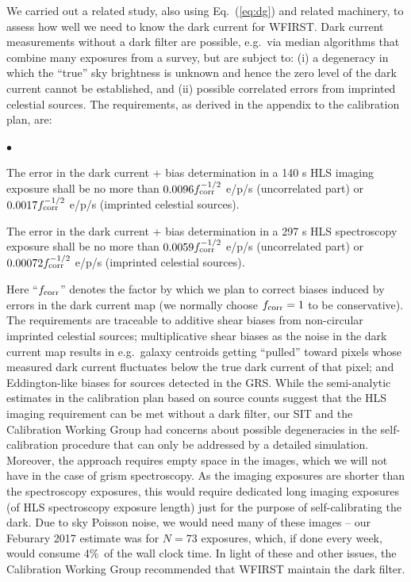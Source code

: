 We carried out a related study, also using Eq.~(\ref{eq:dg}) and related machinery, to assess how well we need to know the dark current for WFIRST. Dark current measurements without a dark filter are possible, e.g.\ via median algorithms that combine many exposures from a survey, but are subject to: (i) a degeneracy in which the ``true'' sky brightness is unknown and hence the zero level of the dark current cannot be established, and (ii) possible correlated errors from imprinted celestial sources. The requirements, as derived in the appendix to the calibration plan, are:
\begin{list}{$\bullet$}{}
\item The error in the dark current + bias determination in a 140 s
HLS imaging exposure shall be no more than $0.0096f_{\rm corr}^{-1/2}$
e/p/s (uncorrelated part) or $0.0017 f_{\rm corr}^{-1/2}$ e/p/s
(imprinted celestial sources).
\item The error in the dark current + bias determination in a 297 s
HLS spectroscopy exposure shall be no more than $0.0059 f_{\rm
corr}^{-1/2}$ e/p/s (uncorrelated part) or $0.00072 f_{\rm
corr}^{-1/2}$ e/p/s (imprinted celestial sources).
\end{list}
Here ``$f_{\rm corr}$'' denotes the factor by which we plan to correct biases induced by errors in the dark current map (we normally choose $f_{\rm corr}=1$ to be conservative). The requirements are traceable to additive shear biases from non-circular imprinted celestial sources; multiplicative shear biases as the noise in the dark current map results in e.g.\ galaxy centroids getting ``pulled'' toward pixels whose measured dark current fluctuates below the true dark current of that pixel; and Eddington-like biases for sources detected in the GRS. While the semi-analytic estimates in the calibration plan based on source counts suggest that the HLS imaging requirement can be met without a dark filter, our SIT and the Calibration Working Group had concerns about possible degeneracies in the self-calibration procedure that can only be addressed by a detailed simulation. Moreover, the approach requires empty space in the images, which we will not have in the case of grism spectroscopy. As the imaging exposures are shorter than the spectroscopy exposures, this would require dedicated long imaging exposures (of HLS spectroscopy exposure length) just for the purpose of self-calibrating the dark. Due to sky Poisson noise, we would need many of these images -- our Feburary 2017 estimate was for $N=73$ exposures, which, if done every week, would consume 4\%\ of the wall clock time. In light of these and other issues, the Calibration Working Group recommended that WFIRST maintain the dark filter.

